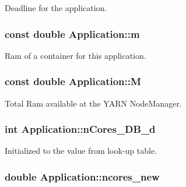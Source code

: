 Deadline for the application. 

\hypertarget{classApplication_ad95ca8809237917d16779d7ed0013c8e}{
\subsubsection[{m}]{\setlength{\rightskip}{0pt plus 5cm}const double Application\-::m\hspace{0.3cm}{\ttfamily [private]}}}\label{classApplication_ad95ca8809237917d16779d7ed0013c8e}


Ram of a container for this application. 

\hypertarget{classApplication_a98cc47f6aa4ac3c70133d2922952ef7a}{
\subsubsection[{M}]{\setlength{\rightskip}{0pt plus 5cm}const double Application\-::\-M\hspace{0.3cm}{\ttfamily [private]}}}\label{classApplication_a98cc47f6aa4ac3c70133d2922952ef7a}


Total Ram available at the Y\-A\-R\-N Node\-Manager. 

\hypertarget{classApplication_a95104d330c9c7ed2c1017b4938a39a9a}{
\subsubsection[{n\-Cores\-\_\-\-D\-B\-\_\-d}]{\setlength{\rightskip}{0pt plus 5cm}int Application\-::n\-Cores\-\_\-\-D\-B\-\_\-d\hspace{0.3cm}{\ttfamily [private]}}}\label{classApplication_a95104d330c9c7ed2c1017b4938a39a9a}


Initialized to the value from look-\/up table. 

\hypertarget{classApplication_a12d69161b8f2767e6ea1d19d3e6457e2}{
\subsubsection[{ncores\-\_\-new}]{\setlength{\rightskip}{0pt plus 5cm}double Application\-::ncores\-\_\-new\hspace{0.3cm}{\ttfamily [private]}}}\label{classApplication_a12d69161b8f2767e6ea1d19d3e6457e2}


